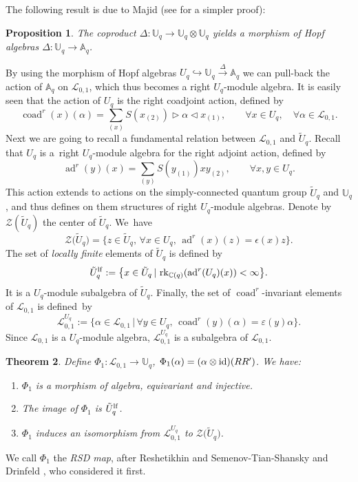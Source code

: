\documentclass[pdftex]{sigma}%
\numberwithin{equation}{section}
\numberwithin{figure}{section}
\newtheorem{teo}{Theorem}[section]
\newtheorem{prop}[teo]{Proposition}
\newcommand{\mUq}{\mathbb{U}_q}
\newcommand{\mc}{\mathbb{C}}
\newcommand{\Ll}{{\mathcal L}}
\newcommand{\ra}{\rightarrow}
\begin{document}
The following result is due to Majid \cite{Majid} (see \cite{DM} for a simpler proof):
\begin{prop} \label{copHopf} The coproduct $\Delta\!\colon\! \mUq \!\ra\! \mUq {\otimes} \mUq$ yields a morphism of Hopf algebras \mbox{$ \Delta\!\colon\! \mUq \!\to\! \mathbb{A}_q$}.
\end{prop}

By using the morphism of Hopf algebras $U_q \hookrightarrow \mUq \xrightarrow{\Delta} \mathbb{A}_q$ we can pull-back the action of $\mathbb{A}_q$ on $\Ll_{0,1}$, which thus becomes a right $U_q$-module algebra. It is easily seen that the action of $U_q$ is the right coadjoint action, defined by
\[\operatorname{coad}^r(x)(\alpha) = \sum_{(x)}{S}(x_{(2)}) \rhd \alpha \lhd x_{(1)},\qquad
\forall x \in U_q, \quad \forall \alpha\in \Ll_{0,1}.\]
Next we are going to recall a fundamental relation between $\Ll_{0,1}$ and $\tilde U_q$. Recall that $U_q$ is a~right $U_q$-module algebra for the right adjoint action, defined by
 \[\operatorname{ad}^r(y)(x) = \sum_{(y)}{S}(y_{(1)}) x y_{(2)}, \qquad \forall x,y \in U_q.\]
This action extends to actions on the simply-connected quantum group $\tilde U_q$ and $\mUq$, and thus defines on them structures of right $U_q$-module algebras. Denote by $\mathcal{Z}(\tilde U_q)$ the center of $\tilde U_q$. We~have
\begin{equation}\label{Zprop}
\mathcal{Z}\big(\tilde U_q\big)= \big\{ z \in \tilde U_q, \,\forall x\in U_q, \,\operatorname{ad}^r(x)(z)=\epsilon(x) z\big\}.
\end{equation}
The set of \emph{locally finite} elements of $\tilde U_q$ is defined by
\[
\tilde U_q^{\rm lf} :=\big\{x\in \tilde U_q\, \vert \, \operatorname{rk}_{\mc(q)}(\operatorname{ad}^r(U_q)(x)) < \infty\big\}.
\]
It is a $U_q$-module subalgebra of $\tilde U_q$.
Finally, the set of $\operatorname{coad}^r$-invariant elements of $\Ll_{0,1}$ is defi\-ned~by
\[
\Ll_{0,1}^{U_q} := \big\{\alpha \in \Ll_{0,1}\, \vert \, \forall y \in U_q,\, \operatorname{coad}^r(y)(\alpha) = \varepsilon(y)\alpha\big\}.
\]
Since $\Ll_{0,1}$ is a $U_q$-module algebra, $\Ll_{0,1}^{U_q}$ is a subalgebra of $\Ll_{0,1}$.

\begin{teo}\label{drinfeldmap} Define $\Phi_1\colon \Ll_{0,1}\ra \mUq$, $\Phi_1(\alpha) = (\alpha \otimes {\rm id})(RR')$. We have:
\begin{enumerate}\itemsep=0pt
\item[$1.$] $\Phi_1$ is a morphism of algebra, equivariant and injective.
\item[$2.$] The image of $\Phi_1$ is $\tilde U_q^{\rm lf}$.
\item[$3.$] $\Phi_1$ induces an isomorphism from $\Ll_{0,1}^{U_q}$ to $\mathcal{Z}\big(\tilde U_q\big)$.
\end{enumerate}
\end{teo}
We call $\Phi_1$ the \emph{RSD map}, after Reshetikhin and Semenov-Tian-Shansky \cite{RSTS} and Drinfeld \cite{Dr,Dr1}, who considered it first.
\end{document}

